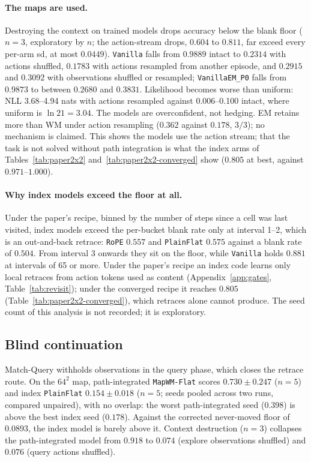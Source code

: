 \documentclass[10pt]{article}
\newcommand{\arm}[1]{\texttt{#1}}
\begin{document}
\paragraph{The maps are used.} Destroying the context on trained models drops accuracy below the
blank floor ($n=3$, exploratory by $n$; the action-stream drops, $0.604$ to $0.811$, far exceed every per-arm
sd, at most $0.0449$). \arm{Vanilla} falls
from $0.9889$ intact to $0.2314$ with actions shuffled, $0.1783$ with actions resampled from another
episode, and $0.2915$ and $0.3092$ with observations shuffled or resampled; \arm{VanillaEM\_P0} falls from
$0.9873$ to between $0.2680$ and $0.3831$. Likelihood becomes worse than uniform: NLL 3.68--4.94 nats with
actions resampled against 0.006--0.100 intact, where uniform is $\ln 21 = 3.04$. The models are
overconfident, not hedging. EM retains more than WM under action resampling ($0.362$ against
$0.178$, $3/3$); no mechanism is claimed. This shows the models use the action stream; that the task
is not solved without path integration is what the index arms of Tables~\ref{tab:paper2x2}
and~\ref{tab:paper2x2-converged} show ($0.805$ at best, against $0.971$--$1.000$).



\paragraph{Why index models exceed the floor at all.} Under the paper's recipe, binned by the number of
steps since a cell was last visited, index models exceed the per-bucket blank rate only at interval 1--2, which is an
out-and-back retrace: \arm{RoPE} $0.557$ and \arm{PlainFlat} $0.575$ against a blank rate of $0.504$.
From interval 3 onwards they sit on the floor, while \arm{Vanilla} holds $0.881$ at intervals of 65
or more. Under the paper's recipe an index code learns only local retraces from action tokens used as content
(Appendix~\ref{app:gates}, Table~\ref{tab:revisit}); under the converged recipe it reaches $0.805$
(Table~\ref{tab:paper2x2-converged}), which retraces alone cannot produce. The seed count of this analysis is not recorded;
it is exploratory. %

\subsection{Blind continuation}
\label{sec:c1-blind}

Match-Query withholds observations in the query phase, which closes the retrace route. On the
$64^2$ map, path-integrated \arm{MapWM-Flat} scores $0.730\pm0.247$ ($n=5$) and index \arm{PlainFlat}
$0.154\pm0.018$ ($n=5$; seeds pooled across two runs, compared unpaired), with no overlap: the worst path-integrated seed ($0.398$) is above the best
index seed ($0.178$). Against the corrected never-moved floor of $0.0893$, the index model is barely
above it. Context destruction ($n=3$) collapses the path-integrated model from $0.918$ to $0.074$ (explore
observations shuffled) and $0.076$ (query actions shuffled). %
\end{document}
